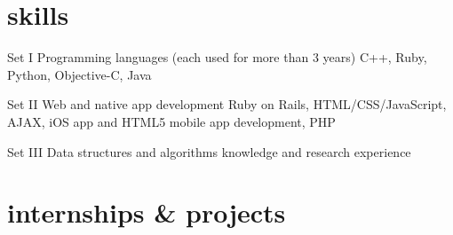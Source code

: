 \documentclass[]{friggeri-cv} %
\begin{document}

\section{skills}

\begin{entrylist}
  \entry
  {Set I}
  {Programming languages (each used for more than 3 years)}
  {}
  {C++, Ruby, Python, Objective-C, Java}

  \entry
  {Set II}
  {Web and native app development}
  {}
  {Ruby on Rails, HTML/CSS/JavaScript, AJAX, iOS app and HTML5 mobile app development, PHP}

  \sentry
  {Set III}
  {Data structures and algorithms knowledge and research experience}
  {}
\end{entrylist}


\section{internships \& projects}
\end{document}
